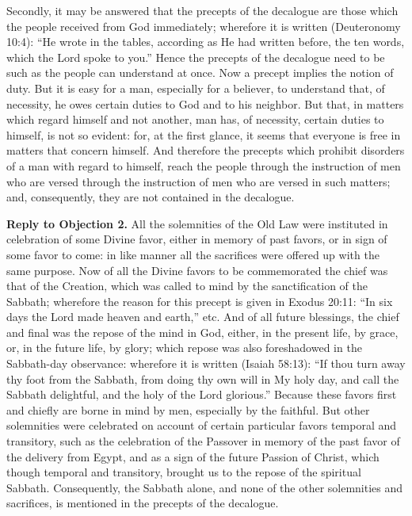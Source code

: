 Secondly, it may be answered that the precepts of the decalogue are those which the people received from God immediately; wherefore it is written (Deuteronomy 10:4): ``He wrote in the tables, according as He had written before, the ten words, which the Lord spoke to you.'' Hence the precepts of the decalogue need to be such as the people can understand at once. Now a precept implies the notion of duty. But it is easy for a man, especially for a believer, to understand that, of necessity, he owes certain duties to God and to his neighbor. But that, in matters which regard himself and not another, man has, of necessity, certain duties to himself, is not so evident: for, at the first glance, it seems that everyone is free in matters that concern himself. And therefore the precepts which prohibit disorders of a man with regard to himself, reach the people through the instruction of men who are versed through the instruction of men who are versed in such matters; and, consequently, they are not contained in the decalogue.

\textbf{Reply to Objection 2.} All the solemnities of the Old Law were instituted in celebration of some Divine favor, either in memory of past favors, or in sign of some favor to come: in like manner all the sacrifices were offered up with the same purpose. Now of all the Divine favors to be commemorated the chief was that of the Creation, which was called to mind by the sanctification of the Sabbath; wherefore the reason for this precept is given in Exodus 20:11: ``In six days the Lord made heaven and earth,'' etc. And of all future blessings, the chief and final was the repose of the mind in God, either, in the present life, by grace, or, in the future life, by glory; which repose was also foreshadowed in the Sabbath-day observance: wherefore it is written (Isaiah 58:13): ``If thou turn away thy foot from the Sabbath, from doing thy own will in My holy day, and call the Sabbath delightful, and the holy of the Lord glorious.'' Because these favors first and chiefly are borne in mind by men, especially by the faithful. But other solemnities were celebrated on account of certain particular favors temporal and transitory, such as the celebration of the Passover in memory of the past favor of the delivery from Egypt, and as a sign of the future Passion of Christ, which though temporal and transitory, brought us to the repose of the spiritual Sabbath. Consequently, the Sabbath alone, and none of the other solemnities and sacrifices, is mentioned in the precepts of the decalogue.

